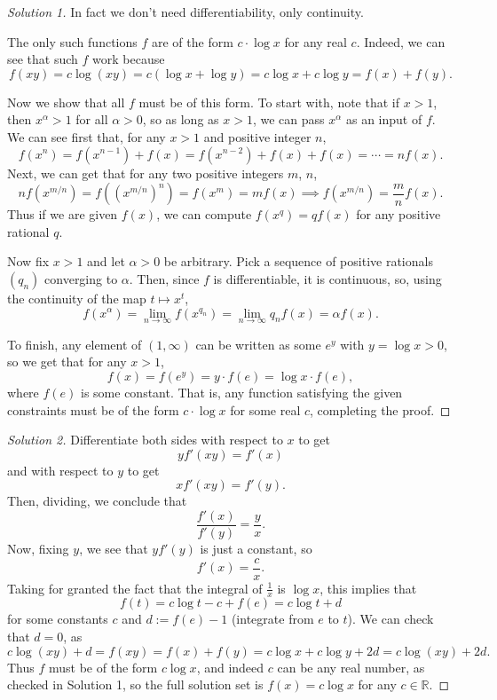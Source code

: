 \documentclass[11pt]{scrartcl}
\providecommand{\RR}{\mathbb R}
\begin{document}
\begin{proof}[Solution 1]
	In fact we don't need differentiability, only continuity.
	
	The only such functions $f$ are of the form $c\cdot\log x$ for any real $c$.
	Indeed, we can see that such $f$ work because
	\[f(xy) = c\log(xy) = c(\log x + \log y) = c\log x + c\log y
	= f(x) + f(y).\]
	
	Now we show that all $f$ must be of this form.
	To start with, note that if $x > 1$, then $x^\alpha > 1$
	for all $\alpha > 0$, so as long as $x > 1$,
	we can pass $x^\alpha$ as an input of $f$.
	We can see first that, for any $x > 1$ and positive integer $n$,
	\[f(x^n) = f(x^{n-1}) + f(x) = f(x^{n-2}) + f(x) + f(x)
	= \cdots = nf(x).\]
	Next, we can get that for any two positive integers $m$, $n$,
	\[nf(x^{m/n}) = f((x^{m/n})^n) = f(x^m) = mf(x)
	\implies f(x^{m/n}) = \frac mn f(x).\]
	Thus if we are given $f(x)$, we can compute $f(x^{q}) = qf(x)$
	for any positive rational $q$.
	
	Now fix $x > 1$ and let $\alpha > 0$ be arbitrary.
	Pick a sequence of positive rationals $(q_n)$ converging to $\alpha$.
	Then, since $f$ is differentiable, it is continuous, so,
	using the continuity of the map $t\mapsto x^t$,
	\[f(x^\alpha) = \lim_{n\to\infty} f(x^{q_n})
	= \lim_{n\to\infty} q_n f(x) = \alpha f(x).\]
	
	To finish, any element of $(1, \infty)$ can be written as some $e^y$
	with $y = \log x > 0$, so we get that for any $x > 1$,
	\[f(x) = f(e^y) = y\cdot f(e) = \log x\cdot f(e),\]
	where $f(e)$ is some constant.
	That is, any function satisfying the given constraints
	must be of the form $c\cdot\log x$ for some real $c$, completing the proof.
\end{proof}

\begin{proof}[Solution 2]
	Differentiate both sides with respect to $x$ to get
	\[yf'(xy) = f'(x)\]
	and with respect to $y$ to get
	\[xf'(xy) = f'(y).\]
	Then, dividing,  we conclude that
	\[\frac{f'(x)}{f'(y)} = \frac yx.\]
	Now, fixing $y$, we see that $yf'(y)$ is just a constant, so
	\[f'(x) = \frac cx.\]
	Taking for granted the fact that the integral of $\frac1x$ is $\log x$,
	this implies that
	\[f(t) = c\log t - c + f(e) = c\log t + d\]
	for some constants $c$ and $d := f(e) - 1$ (integrate from $e$ to $t$).
	We can check that $d = 0$, as
	\[c\log(xy) + d = f(xy) = f(x) + f(y) = c\log x + c\log y + 2d
	= c\log(xy) + 2d.\]
	Thus $f$ must be of the form $c\log x$,
	and indeed $c$ can be any real number, as checked in Solution 1,
	so the full solution set is $f(x) = c\log x$ for any $c\in\RR$.
\end{proof}
\end{document}
